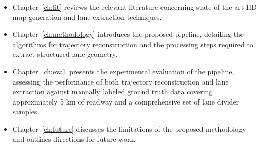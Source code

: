 \begin{itemize}
    \item Chapter~\ref{ch:lit} reviews the relevant literature concerning state-of-the-art HD map generation and lane extraction techniques.

    \item Chapter~\ref{ch:methodology} introduces the proposed pipeline, detailing the algorithms for trajectory reconstruction and the processing steps required to extract structured lane geometry.

    \item Chapter~\ref{ch:eval} presents the experimental evaluation of the pipeline, assessing the performance of both trajectory reconstruction and lane extraction against manually labeled ground truth data covering approximately 5 km of roadway and a comprehensive set of lane divider samples.

    \item Chapter~\ref{ch:future} discusses the limitations of the proposed methodology and outlines directions for future work.
\end{itemize}